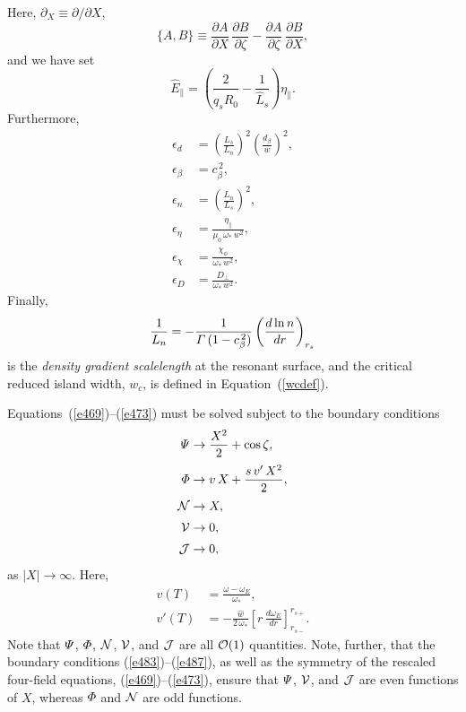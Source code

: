 \documentclass[notitlepage,12pt]{article}
\begin{document}
Here,  $\partial_X\equiv \partial/\partial X$, 
\begin{equation}
\{A,B\} \equiv \frac{\partial A}{\partial X}\,\frac{\partial B}{\partial\zeta} - \frac{\partial A}{\partial \zeta}\,\frac{\partial B}{\partial X},
\end{equation}
and we have set
\begin{equation}
\hat{E}_\parallel = \left(\frac{2}{q_s\hat{R}_0}-\frac{1}{\hat{L}_s}\right)\eta_\parallel.
\end{equation}
Furthermore,
\begin{align}
\epsilon_d &= \left(\frac{L_s}{L_n}\right)^2\left(\frac{d_\beta}{w}\right)^2,\label{e479}\\[0.5ex]
\epsilon_\beta &= c_\beta^{\,2},\label{e480}\\[0.5ex]
\epsilon_n&= \left(\frac{L_n}{L_s}\right)^2,\\[0.5ex]
\epsilon_\eta &= \frac{\eta_\parallel}{\mu_0\,\omega_\ast\,w^2},\label{e481}\\[0.5ex]
\epsilon_\chi &= \frac{\chi_\phi}{\omega_\ast\,w^2},\label{e482}\\[0.5ex]
\epsilon_D &= \frac{D_\perp}{\omega_\ast\,w^2}.
\end{align}
Finally,
\begin{equation}
\frac{1}{L_n}= -\frac{1}{{\mit\Gamma}\,(1-c_\beta^{\,2})}\left(\frac{d\ln n}{dr}\right)_{r_s}
\end{equation}
is the {\em density gradient scalelength}\/  at the resonant surface, 
and the critical reduced island width, $w_c$, is defined in Equation~(\ref{wcdef}). 

Equations~(\ref{e469})--(\ref{e473}) must be solved subject to the boundary conditions
\begin{align}
{\mit\Psi}&\rightarrow \frac{X^{2}}{2} + \cos\zeta,\label{e483}\\[0.5ex]
{\mit\Phi} &\rightarrow v\,X +\frac{ s\,v'\,X^{2}}{2},\label{e484}\\[0.5ex]
{\cal N}&\rightarrow X,\label{e486}\\[0.5ex]
{\cal V}&\rightarrow 0,\label{e486a}\\[0.5ex]
{\cal J}& \rightarrow 0,\label{e487}
\end{align}
as $|X|\rightarrow\infty$.  Here,
\begin{align}
v(T) &= \frac{\omega-\omega_E}{\omega_\ast},\label{e488}\\[0.5ex]
v'(T) &= -\frac{\hat{w}}{2\,\omega_\ast}\left[r\,\frac{d\omega_E}{dr}\right]_{r_{s-}}^{r_{s+}}.\label{e489}
\end{align}
Note that ${\mit\Psi}$, ${\mit\Phi}$, ${\cal N}$, ${\cal V}$, and ${\cal J}$ are all ${\cal O}(1)$ quantities.
Note, further,  that the boundary conditions (\ref{e483})--(\ref{e487}),
as well as the symmetry of the rescaled four-field equations,  (\ref{e469})--(\ref{e473}), ensure that ${\mit\Psi}$, ${\cal V}$, and
${\cal J}$ are even functions of $X$, whereas ${\mit\Phi}$ and ${\cal N}$ are odd functions. 
\end{document}
